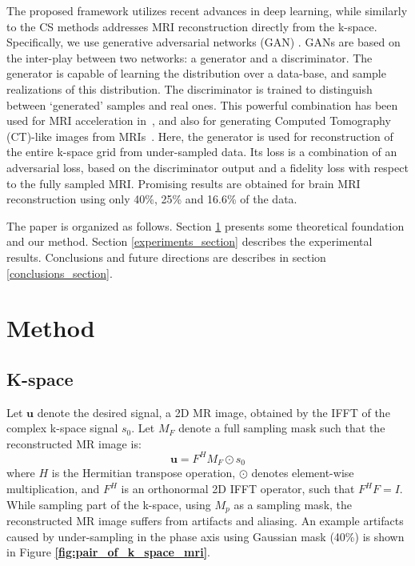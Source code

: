 \documentclass[review]{elsarticle}
\begin{document}
The proposed framework utilizes recent advances in deep learning, while similarly to the CS methods addresses MRI reconstruction directly from the k-space. Specifically, we use generative adversarial networks (GAN) \cite{goodfellow2014generative,radford2015unsupervised,pathak2016context}. 
GANs are based on the inter-play between two networks: a generator and a discriminator. The generator is capable of learning the distribution over a data-base, and sample realizations of this distribution. 
The discriminator is trained to distinguish between `generated' samples and real ones. This powerful combination has been used for MRI acceleration in~\cite{yu2017deep,mardani2017deep}, and also for generating Computed Tomography (CT)-like images from MRIs~\cite{nie2016medical}.
Here, the generator is used for reconstruction of the entire k-space grid from under-sampled data. Its loss is a combination of an adversarial loss, based on the discriminator output and a fidelity loss with respect to the fully sampled MRI. Promising results are obtained for brain MRI reconstruction using only 40\%, 25\% and 16.6\% of the data.

The paper is organized as follows. Section \ref{method_section} presents some theoretical foundation and our method. Section \ref{experiments_section} describes the experimental results. Conclusions and future directions are describes in section \ref{conclusions_section}.

\section{Method}\label{method_section}

\subsection{K-space}
Let $\bm{u}$ denote the desired signal, a 2D MR image, obtained by the IFFT of the complex k-space signal $s_{0}$. Let $M_{F}$ denote a full sampling mask such that the reconstructed MR image is: 
\begin{equation}
\bm{u}=F^{H}M_{F}\odot s_{0}
\end{equation} 
where $H$ is the Hermitian transpose operation, $\odot$ denotes element-wise multiplication, and $F^{H}$ is an orthonormal 2D IFFT operator, such that $F^{H}F=I$. 
While sampling part of the k-space, using $M_{p}$ as a sampling mask, the reconstructed MR image suffers from artifacts and aliasing. An example artifacts caused by under-sampling in the phase axis using Gaussian mask (40\%) is shown in Figure \textbf{\ref{fig:pair_of_k_space_mri}}.
\end{document}
